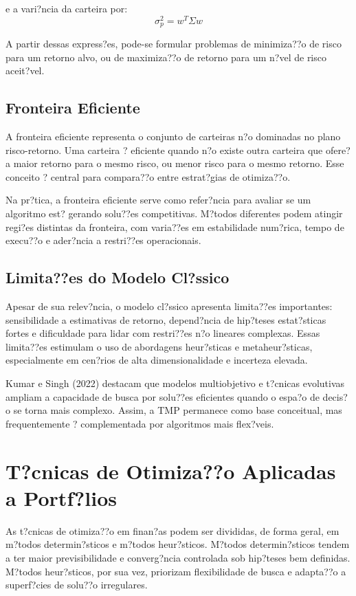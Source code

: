 ﻿\documentclass[
  12pt,
  oneside,
  a4paper,
  brazil
]{abntex2}
\begin{document}
e a vari?ncia da carteira por:
\[
\sigma_p^2=w^T\Sigma w
\]

A partir dessas express?es, pode-se formular problemas de minimiza??o de risco para um retorno alvo, ou de maximiza??o de retorno para um n?vel de risco aceit?vel.

\subsection{Fronteira Eficiente}
A fronteira eficiente representa o conjunto de carteiras n?o dominadas no plano risco-retorno. Uma carteira ? eficiente quando n?o existe outra carteira que ofere?a maior retorno para o mesmo risco, ou menor risco para o mesmo retorno. Esse conceito ? central para compara??o entre estrat?gias de otimiza??o.

Na pr?tica, a fronteira eficiente serve como refer?ncia para avaliar se um algoritmo est? gerando solu??es competitivas. M?todos diferentes podem atingir regi?es distintas da fronteira, com varia??es em estabilidade num?rica, tempo de execu??o e ader?ncia a restri??es operacionais.

\subsection{Limita??es do Modelo Cl?ssico}
Apesar de sua relev?ncia, o modelo cl?ssico apresenta limita??es importantes: sensibilidade a estimativas de retorno, depend?ncia de hip?teses estat?sticas fortes e dificuldade para lidar com restri??es n?o lineares complexas. Essas limita??es estimulam o uso de abordagens heur?sticas e metaheur?sticas, especialmente em cen?rios de alta dimensionalidade e incerteza elevada.

Kumar e Singh (2022) destacam que modelos multiobjetivo e t?cnicas evolutivas ampliam a capacidade de busca por solu??es eficientes quando o espa?o de decis?o se torna mais complexo. Assim, a TMP permanece como base conceitual, mas frequentemente ? complementada por algoritmos mais flex?veis.

\section{T?cnicas de Otimiza??o Aplicadas a Portf?lios}
As t?cnicas de otimiza??o em finan?as podem ser divididas, de forma geral, em m?todos determin?sticos e m?todos heur?sticos. M?todos determin?sticos tendem a ter maior previsibilidade e converg?ncia controlada sob hip?teses bem definidas. M?todos heur?sticos, por sua vez, priorizam flexibilidade de busca e adapta??o a superf?cies de solu??o irregulares.
\end{document}
